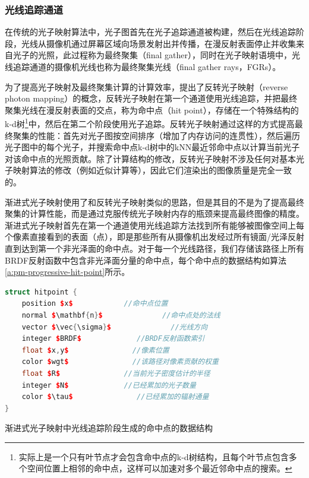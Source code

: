 \subsubsection{光线追踪通道}
在传统的光子映射算法中，光子图首先在光子追踪通道被构建，然后在光线追踪阶段，光线从摄像机通过屏幕区域向场景发射出并传播，在漫反射表面停止并收集来自光子的光照，此过程称为最终聚集（final gather），同时在光子映射语境中，光线追踪通道的摄像机光线也称为最终聚集光线（final gather rays，FGRs）。

为了提高光子映射及最终聚集计算的计算效率，\cite{a:FastFinalGatheringviaReversePhotonMapping}提出了反转光子映射（reverse photon mapping）的概念，反转光子映射在第一个通道使用光线追踪，并把最终聚集光线在漫反射表面的交点，称为命中点（hit point），存储在一个特殊结构的k-d树\footnote{实际上是一个只有叶节点才会包含命中点的k-d树结构，且每个叶节点包含多个空间位置上相邻的命中点，这样可以加速对多个最近邻命中点的搜索。}中，然后在第二个阶段使用光子追踪。反转光子映射通过这样的方式提高最终聚集的性能：首先对光子图按空间排序（增加了内存访问的连贯性），然后遍历光子图中的每个光子，并搜索命中点k-d树中的kNN最近邻命中点以计算当前光子对该命中点的光照贡献。除了计算结构的修改，反转光子映射不涉及任何对基本光子映射算法的修改（例如近似计算等），因此它们渲染出的图像质量是完全一致的。

渐进式光子映射使用了和反转光子映射类似的思路，但是其目的不是为了提高最终聚集的计算性能，而是通过克服传统光子映射内存的瓶颈来提高最终图像的精度。渐进式光子映射首先在第一个通道使用光线追踪方法找到所有能够被图像空间上每个像素直接看到的表面（点），即是那些所有从摄像机出发经过所有镜面/光泽反射直到达到第一个非光泽面的命中点。对于每一个光线路径，我们存储该路径上所有BRDF反射函数中包含非光泽面分量的命中点，每个命中点的数据结构如算法\ref{a:pm-progressive-hit-point}所示。

\begin{algorithm}
\begin{lstlisting}[language=C++, mathescape]
struct hitpoint {
	position $x$            //命中点位置
	normal $\mathbf{n}$              //命中点处的法线
	vector $\vec{\sigma}$              //光线方向
	integer $BRDF$             //BRDF反射函数索引
	float $x,y$               //像素位置
	color $wgt$               //该路径对像素贡献的权重
	float $R$               //当前光子密度估计的半径 
	integer $N$             //已经累加的光子数量 
	color $\tau$               //已经累加的辐射通量
}
\end{lstlisting}	
\caption{渐进式光子映射中光线追踪阶段生成的命中点的数据结构}
\label{a:pm-progressive-hit-point}
\end{algorithm}

